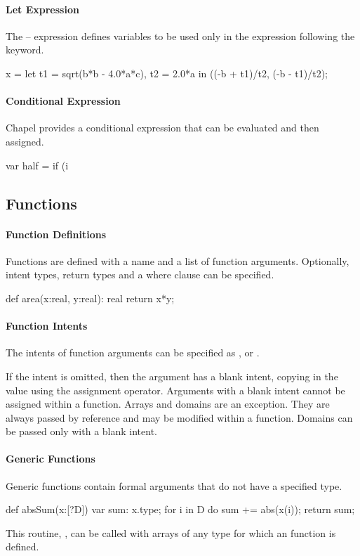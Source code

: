 \paragraph{Let Expression}
The -- expression defines variables to
be used only in the expression following the  keyword.
\begin{chapel}
x = let t1 = sqrt(b*b - 4.0*a*c), t2 = 2.0*a
    in ((-b + t1)/t2, (-b - t1)/t2);
\end{chapel}
\paragraph{Conditional Expression}
Chapel provides a conditional expression that can be evaluated
and then assigned.
\begin{chapel}
var half = if (i %
\end{chapel}

\subsection{Functions}
\paragraph{Function Definitions}
Functions are defined with a name and a list of function
arguments.  Optionally, intent types, return types and a
where clause can be specified.
\begin{chapel}
def area(x:real, y:real): real {
  return x*y;
}
\end{chapel}

\paragraph{Function Intents}
The intents of function arguments can be specified as ,
 or .

If the intent is omitted, then the
argument has a blank intent, copying in the value using the assignment
operator.
Arguments with a blank intent cannot be assigned within a function.
Arrays and domains are an exception.  They are always passed by reference
and may be modified within a function.
Domains can be passed only with a blank intent.

\paragraph{Generic Functions}
Generic functions contain formal arguments that do not have
a specified type.
\begin{chapel}
def absSum(x:[?D]) {
  var sum: x.type;
  for i in D do sum += abs(x(i));
  return sum;
}
\end{chapel}
This routine, , can be called
with arrays of any type for which an  function is
defined.

